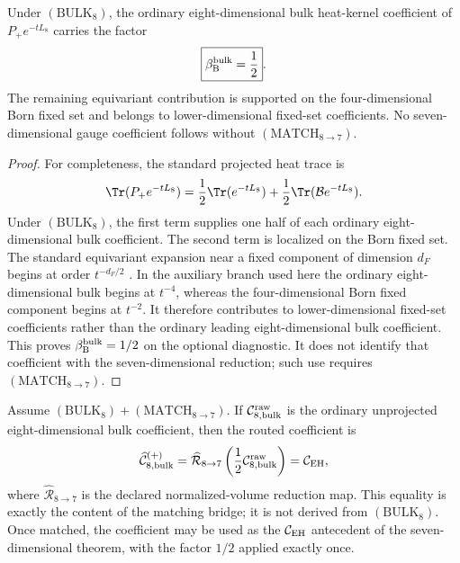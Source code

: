 \documentclass[11pt,a4paper]{article}
\begin{document}
\begin{lemma}
\label{p3:lem:born-even-bulk-projection-factor}
Under \((\mathrm{BULK}_8)\), the ordinary eight-dimensional bulk
heat-kernel coefficient of \(P_+e^{-tL_8}\) carries the factor
\[
 \boxed{\beta_{\rm B}^{\rm bulk}=\frac12}.
\]
The remaining equivariant contribution is supported on the four-dimensional
Born fixed set and belongs to lower-dimensional fixed-set coefficients.  No
seven-dimensional gauge coefficient follows without
\((\mathrm{MATCH}_{8\to7})\).
\end{lemma}

\begin{proof}
For completeness, the standard projected heat trace is
\[
 \Tr(P_+e^{-tL_8})
 =\frac12\Tr(e^{-tL_8})+\frac12\Tr(\mathcal B e^{-tL_8}).
\]
Under \((\mathrm{BULK}_8)\), the first term supplies one half of each ordinary
eight-dimensional bulk coefficient.  The second term is
localized on the Born fixed set.  The standard equivariant expansion near a
fixed component of dimension \(d_F\) begins at order \(t^{-d_F/2}\)
\cite{Wang2009EquivariantHeat}.  In the auxiliary branch used here the ordinary
eight-dimensional bulk begins at \(t^{-4}\), whereas the four-dimensional Born
fixed component begins at \(t^{-2}\).  It therefore contributes to
lower-dimensional fixed-set coefficients rather than the ordinary leading
eight-dimensional bulk coefficient.  This proves
\(\beta_{\rm B}^{\rm bulk}=1/2\) on the optional diagnostic.  It does not
identify that coefficient with the seven-dimensional reduction; such use
requires \((\mathrm{MATCH}_{8\to7})\).
\end{proof}

\begin{corollary}
\label{p3f:cor:typed-eight-to-seven-routing}
Assume \((\mathrm{BULK}_8)+(\mathrm{MATCH}_{8\to7})\).  If
\(\mathcal C_{8,{\rm bulk}}^{\rm raw}\) is the ordinary unprojected
eight-dimensional bulk coefficient, then the routed coefficient is
\[
 \widehat{\mathcal C}_{8,{\rm bulk}}^{(+)}
 =\widehat{\mathcal R}_{8\to7}
   \left(\frac12\mathcal C_{8,{\rm bulk}}^{\rm raw}\right)
 =\mathcal C_{\rm EH},
\]
where \(\widehat{\mathcal R}_{8\to7}\) is the declared normalized-volume
reduction map.  This equality is exactly the content of the matching bridge;
it is not derived from \((\mathrm{BULK}_8)\).  Once matched, the coefficient
may be used as the \(\mathcal C_{\rm EH}\) antecedent of the
seven-dimensional theorem, with the factor \(1/2\) applied exactly once.
\end{corollary}
\end{document}
